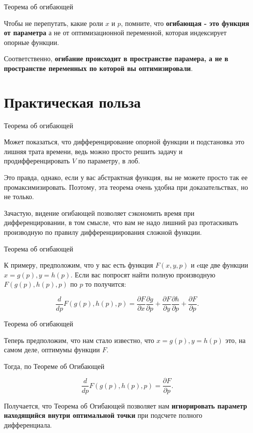 \documentclass{beamer}
\begin{document}
\begin{frame}{Теорема об огибающей}

Чтобы не перепутать, какие роли $x$ и $p$, помните, что \textbf{огибающая - это функция от параметра} а не от оптимизационной переменной, которая индексирует  опорные функции. 

Соответственно, \textbf{огибание происходит в пространстве парамера, а не в пространстве переменных по которой вы оптимизировали}.

\end{frame}

\section{Практическая польза}

\begin{frame}{Теорема об огибающей}

Может показаться, что дифференцирование опорной функции и подстановка это лишняя трата времени, ведь можно просто решить задачу и продифференцировать $V$ по параметру, в лоб.

Это правда, однако, если у вас абстрактная функция, вы не можете просто так ее промаксимизировать. Поэтому, эта теорема очень удобна при доказательствах, но не только. 

Зачастую, видение огибающей позволяет сэкономить время при дифференцировании, в том смысле, что вам не надо лишний раз протаскивать производную по правилу дифференциирования сложной функции.

\end{frame}

\begin{frame}{Теорема об огибающей}

К примеру, предположим, что у вас есть функция $F(x, y, p)$ и eще две функции $x = g(p), y = h(p)$. Если вас попросят найти полную производную $F(g(p), h(p), p)$ по $p$ то получится:

$$\frac{d}{dp} F(g(p), h(p), p) = \frac{\partial F}{\partial x} \frac{\partial g}{\partial p} + \frac{\partial F}{\partial y} \frac{\partial h}{\partial p} + \frac{\partial F}{\partial p}.$$

\end{frame}

\begin{frame}{Теорема об огибающей}

Теперь предположим, что нам стало известно, что $x = g(p), y = h(p)$ это, на самом деле, оптимумы функции $F$. 

Тогда, по Теореме об Огибающей

$$\frac{d}{dp} F(g(p), h(p), p) = \frac{\partial F}{\partial p}.$$

Получается, что Теорема об Огибающей позволяет нам \textbf{игнорировать параметр находящийся внутри оптимальной точки} при подсчете полного дифференциала.

\end{frame}
\end{document}
